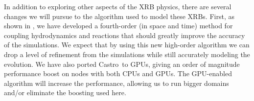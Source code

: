 \documentclass[preprint,times,tighten]{aastex63}
\newcommand{\castro}{{\sf Castro}}
\newcommand{\pynucastro}{{\sf pynucastro}}
\newcommand{\MarginPar}[1]{
    \marginpar{\vskip-\baselineskip%
               \raggedright%
               \tiny\sffamily%
               {\color{red}\hrule%
               \smallskip%
               #1\par%
               \smallskip%
               \hrule}}%
}
\begin{document}




In addition to exploring other aspects of the XRB physics, there are several changes we will pursue to the algorithm used to
model these XRBs.  First, as shown in \citet{castro-sdc}, we have
developed a fourth-order (in space and time) method for coupling
hydrodynamics and reactions that should greatly improve the accuracy
of the simulations.  We expect that by using this new high-order
algorithm we can drop a level of refinement from the simulations while
still accurately modeling the evolution.  We have also ported
\castro\ to GPUs, giving an order of magnitude performance boost on
nodes with both CPUs and GPUs.  The GPU-enabled algorithm will
increase the performance, allowing us to run bigger domains and/or
eliminate the boosting used here.

\end{document}
